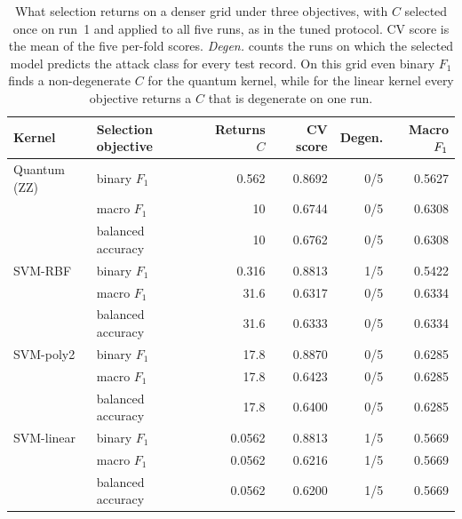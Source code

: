 \begin{table}[t]
\centering
\caption{What selection returns on a denser grid under three
objectives, with $C$ selected once on run~1 and applied to all five
runs, as in the tuned protocol. CV score is the mean of the five
per-fold scores. \emph{Degen.} counts the runs on which the selected
model predicts the attack class for every test record. On this grid
even binary $F_1$ finds a non-degenerate $C$ for the quantum kernel,
while for the linear kernel every objective returns a $C$ that is
degenerate on one run.}
\label{tab:objective}
\begin{tabular}{l@{\hskip 1.0em}l@{\hskip 1.4em}r@{\hskip 1.4em}r@{\hskip 1.4em}r@{\hskip 1.4em}r}
\toprule
Kernel & Selection objective & Returns $C$ & CV score & Degen. & Macro $F_1$ \\
\midrule
Quantum (ZZ) & binary $F_1$ & 0.562 & 0.8692 & 0/5 & 0.5627 \\
 & macro $F_1$ & 10 & 0.6744 & 0/5 & 0.6308 \\
 & balanced accuracy & 10 & 0.6762 & 0/5 & 0.6308 \\
\addlinespace[2pt]
SVM-RBF & binary $F_1$ & 0.316 & 0.8813 & 1/5 & 0.5422 \\
 & macro $F_1$ & 31.6 & 0.6317 & 0/5 & 0.6334 \\
 & balanced accuracy & 31.6 & 0.6333 & 0/5 & 0.6334 \\
\addlinespace[2pt]
SVM-poly2 & binary $F_1$ & 17.8 & 0.8870 & 0/5 & 0.6285 \\
 & macro $F_1$ & 17.8 & 0.6423 & 0/5 & 0.6285 \\
 & balanced accuracy & 17.8 & 0.6400 & 0/5 & 0.6285 \\
\addlinespace[2pt]
SVM-linear & binary $F_1$ & 0.0562 & 0.8813 & 1/5 & 0.5669 \\
 & macro $F_1$ & 0.0562 & 0.6216 & 1/5 & 0.5669 \\
 & balanced accuracy & 0.0562 & 0.6200 & 1/5 & 0.5669 \\
\bottomrule
\end{tabular}
\end{table}

